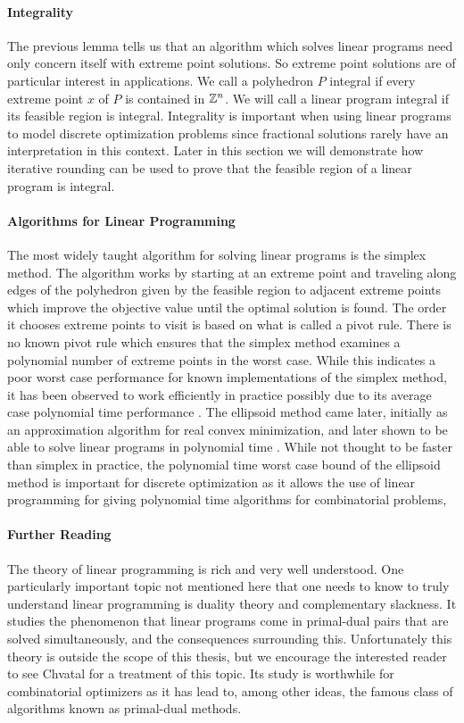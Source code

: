 \paragraph{Integrality}
The previous lemma tells us that an algorithm which solves linear programs need only concern itself with extreme point solutions. So extreme point solutions are of particular interest in applications. We call a polyhedron $P$ integral if every extreme point $x$ of $P$ is contained in $\mathbb{Z}^n$. We will call a linear program integral if its feasible region is integral. Integrality is important when using linear programs to model discrete optimization problems since fractional solutions rarely have an interpretation in this context. Later in this section we will demonstrate how iterative rounding can be used to prove that the feasible region of a linear program is integral.
\paragraph{Algorithms for Linear Programming}
The most widely taught algorithm for solving linear programs is the simplex method\cite{dantzig1955generalized}. The algorithm works by starting at an extreme point and traveling along edges of the polyhedron given by the feasible region to adjacent extreme points which improve the objective value until the optimal solution is found. The order it chooses extreme points to visit is based on what is called a pivot rule. There is no known pivot rule which ensures that the simplex method examines a polynomial number of extreme points in the worst case. While this indicates a poor worst case performance for known implementations of the simplex method, it has been observed to work efficiently in practice possibly due to its average case polynomial time performance \cite{smale1983average}. The ellipsoid method came later, initially as an approximation algorithm for real convex minimization, and later shown to be able to solve linear programs in polynomial time \cite{grotschel1981ellipsoid}. While not thought to be faster than simplex in practice, the polynomial time worst case bound of the ellipsoid method is important for discrete optimization as it allows the use of linear programming for giving polynomial time algorithms for combinatorial problems,
\paragraph{Further Reading}
The theory of linear programming is rich and very well understood. One particularly important topic not mentioned here that one needs to know to truly understand linear programming is duality theory and complementary slackness. It studies the phenomenon that linear programs come in primal-dual pairs that are solved simultaneously, and the consequences surrounding this. Unfortunately this theory is outside the scope of this thesis, but we encourage the interested reader to see Chvatal \cite{chvatal1983linear} for a treatment of this topic. Its study is worthwhile for combinatorial optimizers as it has lead to, among other ideas, the famous class of algorithms known as primal-dual methods.
